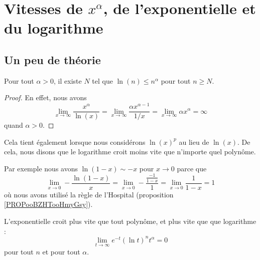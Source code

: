 \section{Vitesses de $x^{\alpha}$, de l'exponentielle et du logarithme}

\subsection{Un peu de théorie}

\begin{lemma}   \label{LemSYHKooUiSMFJ}
    Pour tout \( \alpha>0\), il existe \( N\) tel que \( \ln(n)\leq n^{\alpha}\) pour tout \( n\geq N\).
\end{lemma}

\begin{proof}
En effet, nous avons
\begin{equation}
    \lim_{x\to\infty} \frac{ x^{\alpha} }{ \ln(x) }=\lim_{x\to\infty} \frac{ \alpha x^{\alpha-1} }{ 1/x }=\lim_{x\to\infty} \alpha x^{\alpha}=\infty
\end{equation}
quand $\alpha>0$. 
\end{proof}
Cela tient également lorsque nous considérons $\ln(x)^p$ au lieu de $\ln(x)$. De cela, nous disons que le logarithme croit moins vite que n'importe quel polynôme. 

\begin{example}
    Par exemple nous avons \( \ln(1-x)\sim -x\) pour \( x\to 0\) parce que
    \begin{equation}    \label{EqGICpOX}
        \lim_{x\to 0} -\frac{ \ln(1-x) }{ x }=\lim_{x\to 0} -\frac{ \frac{ -1 }{ 1-x } }{ 1 }=\lim_{x\to 0} \frac{1}{ 1-x }=1
    \end{equation}
    où nous avons utilisé la règle de l'Hospital (proposition \ref{PROPooBZHTooHmyGsy}).
\end{example}

\begin{lemma}
    L'exponentielle croit plus vite que tout polynôme, et plus vite que que logarithme :
    \begin{equation}        \label{EqExpDecrtPlusVite}
        \lim_{t\to\infty} e^{-t}(\ln t)^{n}t^{\alpha}=0
    \end{equation}
    pour tout $n$ et pour tout $\alpha$.
\end{lemma}

